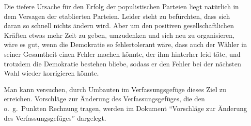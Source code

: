 Die tiefere Ursache für den Erfolg der populistischen Parteien liegt natürlich in dem Versagen der etablierten Parteien.
Leider steht zu befürchten, dass sich daran so schnell nichts ändern wird.
Aber um den positiven gesellschaftlichen Kräften etwas mehr Zeit zu geben, umzudenken und sich neu zu organisieren, wäre es gut, wenn die Demokratie so fehlertolerant wäre, dass auch der Wähler in seiner Gesamtheit einen Fehler machen könnte, der ihm hinterher leid täte, und trotzdem die Demokratie bestehen bliebe, sodass er den Fehler bei der nächsten Wahl wieder korrigieren könnte.

Man kann versuchen, durch Umbauten im Verfassungsgefüge dieses Ziel zu erreichen.
Vorschläge zur Änderung des Verfassungsgefüges, die den o.~g.\ Punkten Rechnung tragen, werden im Dokument \enquote{Vorschläge zur Änderung des Verfassungsgefüges} dargelegt.
